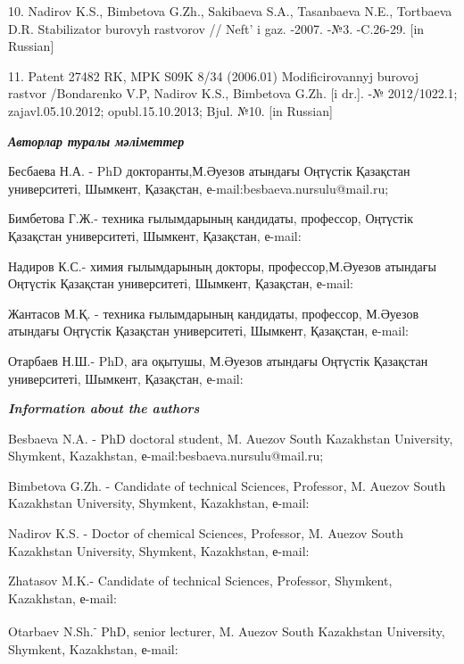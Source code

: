 \begin{references}
10. Nadirov K.S., Bimbetova G.Zh., Sakibaeva S.A., Tasanbaeva N.E.,
Tortbaeva D.R. Stabilizator burovyh rastvorov // Neft'{}
i gaz. -2007. -№3. -C.26-29. {[}in Russian{]}

11. Patent 27482 RK, MPK S09K 8/34 (2006.01) Modificirovannyj burovoj
rastvor /Bondarenko V.P, Nadirov K.S., Bimbetova G.Zh. {[}i dr.{]}. -№
2012/1022.1; zajavl.05.10.2012; opubl.15.10.2013; Bjul. №10. {[}in
Russian{]}
\end{references}

\begin{authorinfo}
\emph{{\bfseries Авторлар туралы мәліметтер}}

Бесбаева Н.А. - PhD докторанты,М.Әуезов атындағы Оңтүстік Қазақстан
университеті, Шымкент, Қазақстан, е-mail:besbaeva.nursulu@mail.ru;

Бимбетова Г.Ж.- техника ғылымдарының кандидаты, профессор, Оңтүстік
Қазақстан университеті, Шымкент, Қазақстан, е-mail:


Надиров К.С.- химия ғылымдарының докторы, профессор,М.Әуезов атындағы
Оңтүстік Қазақстан университеті, Шымкент, Қазақстан, е-mail:


Жантасов М.Қ. - техника ғылымдарының кандидаты, профессор, М.Әуезов
атындағы Оңтүстік Қазақстан университеті, Шымкент, Қазақстан, е-mail:


Отарбаев Н.Ш.- PhD, аға оқытушы, М.Әуезов атындағы Оңтүстік Қазақстан
университеті, Шымкент, Қазақстан, е-mail:
\href{mailto:otarbaevn@mail.ru}{}

\emph{{\bfseries Information about the authors}}

Besbaeva N.A. - PhD doctoral student, M. Auezov South Kazakhstan
University, Shymkent, Kazakhstan, е-mail:besbaeva.nursulu@mail.ru;

Bimbetova G.Zh. - Candidate of technical Sciences, Professor, M. Auezov
South Kazakhstan University, Shymkent, Kazakhstan, е-mail:


Nadirov K.S. - Doctor of chemical Sciences, Professor, M. Auezov South
Kazakhstan University, Shymkent, Kazakhstan, е-mail:


Zhatasov M.K.- Candidate of technical Sciences, Professor, Shymkent,
Kazakhstan, е-mail:


Otarbaev N.Sh.\textsuperscript{-} PhD, senior lecturer, M. Auezov South
Kazakhstan University, Shymkent, Kazakhstan, е-mail:
\href{mailto:otarbaevn@mail.ru}{}
\end{authorinfo}
